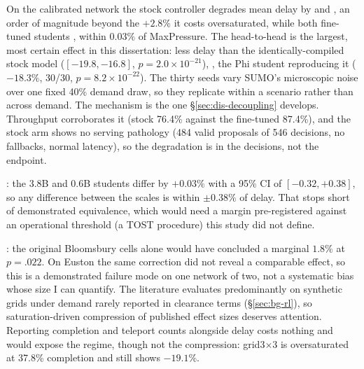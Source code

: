  On the
calibrated network the stock controller degrades mean delay by
 and , an order of magnitude beyond the $+2.8\%$ it costs
oversaturated, while both fine-tuned students , within $0.03\%$ of MaxPressure. The head-to-head is the largest, most
certain effect in this dissertation:  less delay than
the identically-compiled stock model ($[-19.8, -16.8]$,
$p{=}2.0{\times}10^{-21}$), , the Phi
student reproducing it ($-18.3\%$, 30/30, $p{=}8.2{\times}10^{-22}$). The
thirty seeds vary SUMO's microscopic noise over one fixed 40\% demand
draw, so they replicate within a scenario rather than across demand. The
mechanism is the one \S\ref{sec:dis-decoupling} develops.
Throughput corroborates it (stock 76.4\% against the fine-tuned 87.4\%),
and the stock arm shows no serving pathology (484 valid proposals of
546 decisions, no fallbacks, normal latency), so the degradation is in the
decisions, not the endpoint.

: the 3.8B and 0.6B students differ by $+0.03\%$ with
a 95\% CI of $[-0.32, +0.38]$, so any difference between the scales is
within $\pm0.38\%$ of delay. That stops short of demonstrated
equivalence, which would need a margin pre-registered
against an operational threshold (a TOST procedure) this study did not
define.

: the original Bloomsbury cells alone
would have concluded a marginal $1.8\%$
at $p{=}.022$. On Euston the
same correction did not reveal a comparable effect, so this is a
demonstrated failure mode on one network of two, not a systematic bias
whose size I can quantify. The literature
evaluates predominantly on synthetic grids under demand rarely reported in
clearance terms (\S\ref{sec:bg-rl}), so
saturation-driven compression of published effect sizes deserves
attention. Reporting completion and teleport counts alongside delay costs
nothing and would expose the regime, though not the compression:
grid3$\times$3 is oversaturated at 37.8\% completion and still shows
$-19.1\%$.

